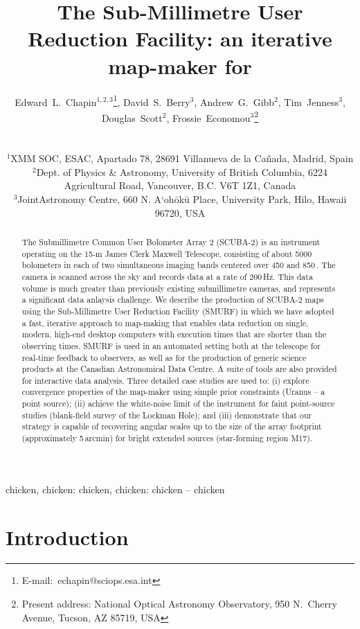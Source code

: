 \documentclass[useAMS,usenatbib,nofootinbib]{mn2e}
\title[SMURF: an iterative map-maker for \scuba]{The Sub-Millimetre User
Reduction Facility: an iterative map-maker for \scuba}
\author[Edward~L.~Chapin~et~al.]{
  \parbox[t]{\textwidth}{
    Edward~L.~Chapin$^{1,2,3}$\thanks{E-mail:~echapin@sciops.esa.int},
    David~S.~Berry$^{3}$,
    Andrew~G.~Gibb$^{2}$,
    Tim~Jenness$^{3}$,
    Douglas~Scott$^{2}$,
    Frossie~Economou$^3$\thanks{Present address: National Optical
      Astronomy Observatory, 950 N.\ Cherry Avenue, Tucson, AZ 85719, USA}
  }
  \\
  \\
  $^{1}$XMM SOC, ESAC, Apartado 78, 28691 Villanueva de la Ca\~nada, Madrid,
  Spain\\
  $^{2}$Dept. of Physics \& Astronomy, University of British Columbia,
  6224 Agricultural Road, Vancouver, B.C. V6T 1Z1, Canada\\
  $^{3}$JointAstronomy Centre, 660 N. A`oh\={o}k\={u} Place, University
  Park, Hilo, Hawaii 96720, USA}
\newcommand{\scuba}{SCUBA-2}
\begin{document}
\label{firstpage}

\maketitle

\begin{abstract}
  The Submillimetre Common User Bolometer Array 2 (\scuba) is an
  instrument operating on the 15-m James Clerk Maxwell Telescope,
  consisting of about 5000 bolometers in each of two simultaneous
  imaging bands centered over 450 and 850\,\micron. The camera is
  scanned across the sky and records data at a rate of 200\,Hz. This
  data volume is much greater than previously existing submillimetre
  cameras, and represents a significant data anlaysis challenge. We
  describe the production of SCUBA-2 maps using the Sub-Millimetre
  User Reduction Facility (SMURF) in which we have adopted a fast,
  iterative approach to map-making that enables data reduction on
  single, modern, high-end desktop computers with execution times that
  are shorter than the observing times.  SMURF is used in an automated
  setting both at the telescope for real-time feedback to observers,
  as well as for the production of generic science products at the
  Canadian Astronomical Data Centre. A suite of tools are also
  provided for interactive data analysis.  Three detailed case studies
  are used to: (i) explore convergence properties of the map-maker
  using simple prior constraints (Uranus -- a point source); (ii)
  achieve the white-noise limit of the instrument for faint
  point-source studies (blank-field survey of the Lockman Hole); and
  (iii) demonstrate that our strategy is capable of recovering angular
  scales up to the size of the array footprint (approximately
  5\,arcmin) for bright extended sources (star-forming region M17).
\end{abstract}


\begin{keywords}
chicken, chicken: chicken, chicken: chicken -- chicken
\end{keywords}

\section{Introduction}
\label{sec:intro}

\end{document}
